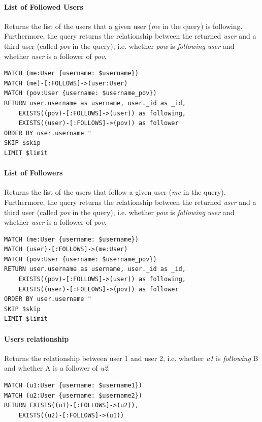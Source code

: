 \documentclass[11pt]{article}
\begin{document}
\paragraph{List of Followed Users} Returns the list of the users that a given user (\emph{me} in the query) is following. Furthermore, the query returns the relationship between the returned \emph{user} and a third user (called \emph{pov} in the query), i.e. whether \emph{pow} is \emph{following} \emph{user} and whether \emph{user} is a follower of \emph{pov}. 

\begin{lstlisting}[language=Cypher]
MATCH (me:User {username: $username})
MATCH (me)-[:FOLLOWS]->(user:User)
MATCH (pov:User {username: $username_pov})
RETURN user.username as username, user._id as _id,
    EXISTS((pov)-[:FOLLOWS]->(user)) as following,
    EXISTS((user)-[:FOLLOWS]->(pov)) as follower
ORDER BY user.username "
SKIP $skip
LIMIT $limit
\end{lstlisting}

\paragraph{List of Followers} Returns the list of the users that follow a given user (\emph{me} in the query). Furthermore, the query returns the relationship between the returned \emph{user} and a third user (called \emph{pov} in the query), i.e. whether \emph{pow} is \emph{following} \emph{user} and whether \emph{user} is a follower of \emph{pov}. 

\begin{lstlisting}[language=Cypher]
MATCH (me:User {username: $username})
MATCH (user)-[:FOLLOWS]->(me:User)
MATCH (pov:User {username: $username_pov})
RETURN user.username as username, user._id as _id,
    EXISTS((pov)-[:FOLLOWS]->(user)) as following,
    EXISTS((user)-[:FOLLOWS]->(pov)) as follower
ORDER BY user.username "
SKIP $skip
LIMIT $limit
\end{lstlisting}

\paragraph{Users relationship} Returns the relationship between user 1 and user 2, i.e. whether \emph{u1} is \emph{following} B and whether A is a follower of \emph{u2}. 

\begin{lstlisting}[language=Cypher]
MATCH (u1:User {username: $username1})
MATCH (u2:User {username: $username2})
RETURN EXISTS((u1)-[:FOLLOWS]->(u2)),
    EXISTS((u2)-[:FOLLOWS]->(u1))
\end{lstlisting}
\end{document}
